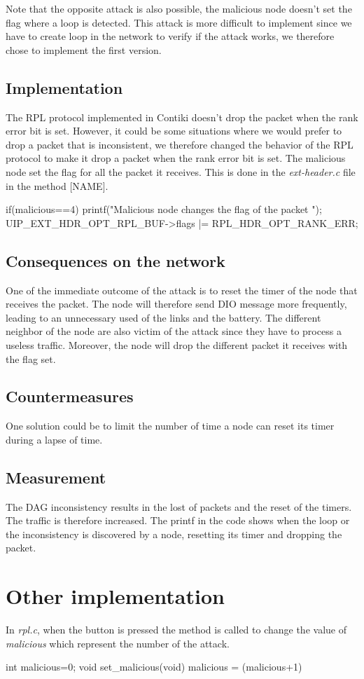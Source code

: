 \documentclass{report}
\begin{document}
Note that the opposite attack is also possible, the malicious node doesn't set the flag where a loop is detected. This attack is more difficult to implement since we have to create loop in the network to verify if the attack works, we therefore chose to implement the first version.

\subsection*{Implementation}
The RPL protocol implemented in Contiki doesn't drop the packet when the rank error bit is set. However, it could be some situations where we would prefer to drop a packet that is inconsistent, we therefore changed the behavior of the RPL protocol to make it drop a packet when the rank error bit is set. The malicious node set the flag for all the packet it receives. This is done in the \textit{ext-header.c} file in the method [NAME].

\begin{myc}
if(malicious==4){
	printf("Malicious node changes the flag of the packet \n");
	UIP_EXT_HDR_OPT_RPL_BUF->flags |= RPL_HDR_OPT_RANK_ERR;
}

\end{myc}
\subsection*{Consequences on the network}
One of the immediate outcome of the attack is to reset the timer of the node that receives the packet. The node will therefore send DIO message more frequently, leading to an unnecessary used of the links and the battery. The different neighbor of the node are also victim of the attack since they have to process a useless traffic. Moreover, the node will drop the different packet it receives with the flag set.

\subsection*{Countermeasures}

One solution could be to limit the number of time a node can reset its timer during a lapse of time. 
\subsection*{Measurement}
The DAG inconsistency results in the lost of packets and the reset of the timers. The traffic is therefore increased. The printf in the code shows when the loop or the inconsistency is discovered by a node, resetting its timer and dropping the packet. 


\section{Other implementation}
In \textit{rpl.c}, when the button is pressed the method is called to change the value of \textit{malicious} which represent the number of the attack.

\begin{myc}
int malicious=0;
void
set_malicious(void){
	malicious = (malicious+1)%
}
\end{myc}
\end{document}
